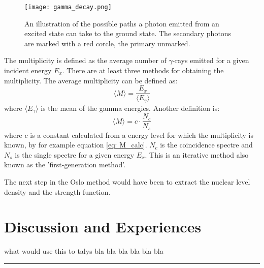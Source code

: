 \documentclass[11pt,a4wide]{article}
\begin{document}
\begin{figure}[htp]
\centering
\texttt{[image: gamma\_decay.png]}
\caption{An illustration of the possible paths a photon emitted from an excited state can take to the ground state. The secondary photons are marked with a red corcle, the primary unmarked.}
\label{fig: gamma_decay}
\end{figure}

The multiplicity is defined as the average number of $\gamma$-rays emitted for a given incident energy $E_x$. There are at least three methods for obtaining the multiplicity. The average multiplicity can be defined as:
\begin{equation}
\langle M \rangle = \frac{E_x}{\langle E_\gamma \rangle}
\label{eq: M_calc}
\end{equation}
where $\langle E_\gamma \rangle$ is the mean of the gamma energies. Another definition is:
\begin{equation}
\langle M \rangle = c \cdot \frac{N_c}{N_s}
\end{equation}
where $c$ is a constant calculated from a energy level for which the multiplicity is known, by for example equation \ref{eq: M_calc}. $N_c$ is the coincidence spectre and $N_s$ is the single spectre for a given energy $E_x$. This is an iterative method also known as the 'first-generation method'. 

The next step in the Oslo method would have been to extract the nuclear level density and the strength function. 


\section{Discussion and Experiences}

what would use this to talys bla bla bla bla bla bla



\noindent\rule{\textwidth}{1pt}
\end{document}
